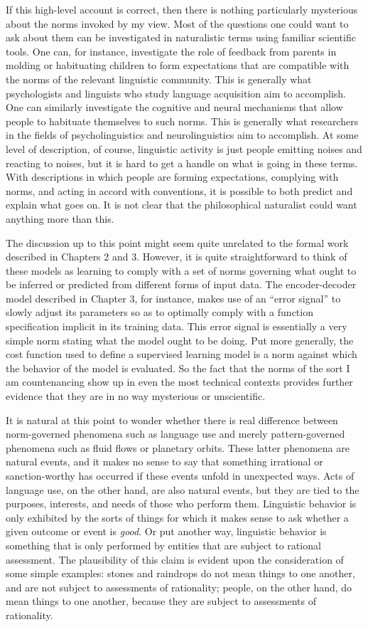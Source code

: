 If this high-level account is correct, then there is nothing particularly mysterious about the norms invoked by my view. Most of the questions one could want to ask about them can be investigated in naturalistic terms using familiar scientific tools. One can, for instance, investigate the role of feedback from parents in molding or habituating children to form expectations that are compatible with the norms of the relevant linguistic community. This is generally what psychologists and linguists who study language acquisition aim to accomplish. One can similarly investigate the cognitive and neural mechanisms that allow people to habituate themselves to such norms. This is generally what researchers in the fields of psycholinguistics and neurolinguistics aim to accomplish. At some level of description, of course, linguistic activity is just people emitting noises and reacting to noises, but it is hard to get a handle on what is going in these terms. With descriptions in which people are forming expectations, complying with norms, and acting in accord with conventions, it is possible to both predict and explain what goes on. It is not clear that the philosophical naturalist could want anything more than this. 

The discussion up to this point might seem quite unrelated to the formal work described in Chapters 2 and 3. However, it is quite straightforward to think of these models as learning to comply with a set of norms governing what ought to be inferred or predicted from different forms of input data. The encoder-decoder model described in Chapter 3, for instance, makes use of an ``error signal'' to slowly adjust its parameters so as to optimally comply with a function specification implicit in its training data. This error signal is essentially a very simple norm stating what the model ought to be doing. Put more generally, the cost function used to define a supervised learning model is a norm against which the behavior of the model is evaluated. So the fact that the norms of the sort I am countenancing show up in even the most technical contexts provides further evidence that they are in no way mysterious or unscientific. 

It is natural at this point to wonder whether there is real difference between norm-governed phenomena such as language use and merely pattern-governed phenomena such as fluid flows or planetary orbits. These latter phenomena are natural events, and it makes no sense to say that something irrational or sanction-worthy has occurred if these events unfold in unexpected ways. Acts of language use, on the other hand, are also natural events, but they are tied to the purposes, interests, and needs of those who perform them. Linguistic behavior is only exhibited by the sorts of things for which it makes sense to ask whether a given outcome or event is \textit{good}. Or put another way, linguistic behavior is something that is only performed by entities that are subject to rational assessment. The plausibility of this claim is evident upon the consideration of some simple examples: stones and raindrops do not mean things to one another, and are not subject to assessments of rationality; people, on the other hand, do mean things to one another, because they are subject to assessments of rationality. 

